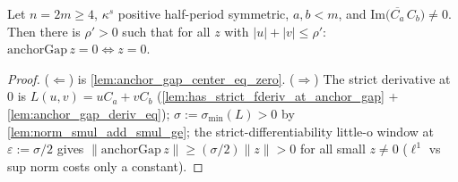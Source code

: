 \begin{lemma}
  \label{lem:anchor_gap_zero_iff}
  Let $n = 2m \ge 4$, $\kappa^s$ positive half-period symmetric, $a, b < m$,
  and $\mathrm{Im}\bigl(\overline{C_a}\,C_b\bigr) \ne 0$. Then there is
  $\rho' > 0$ such that for all $z$ with $|u| + |v| \le \rho'$:
  $\mathrm{anchorGap}\,z = 0 \iff z = 0$.
\end{lemma}
\begin{proof}
        \leanok
  ($\Leftarrow$) is \cref{lem:anchor_gap_center_eq_zero}. ($\Rightarrow$) The
  strict derivative at $0$ is $L(u,v) = u C_a + v C_b$
  (\cref{lem:has_strict_fderiv_at_anchor_gap} + \cref{lem:anchor_gap_deriv_eq});
  $\sigma := \sigma_{\min}(L) > 0$ by \cref{lem:norm_smul_add_smul_ge}; the
  strict-differentiability little-o window at $\varepsilon := \sigma/2$ gives
  $\|\mathrm{anchorGap}\,z\| \ge (\sigma/2)\|z\| > 0$ for all small $z \ne 0$
  ($\ell^1$ vs sup norm costs only a constant).
\end{proof}

